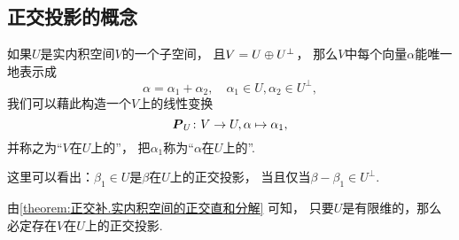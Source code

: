 \subsection{正交投影的概念}
如果\(U\)是实内积空间\(V\)的一个子空间，
且\(V = U \oplus U^\perp\)，
那么\(V\)中每个向量\(\alpha\)能唯一地表示成\begin{equation*}
	\alpha = \alpha_1 + \alpha_2,
	\quad \alpha_1 \in U, \alpha_2 \in U^\perp,
\end{equation*}
我们可以藉此构造一个\(V\)上的线性变换\begin{equation*}
	\boldsymbol{P}_U\colon V \to U,
	\alpha \mapsto \alpha_1,
\end{equation*}
并称之为“\(V\)在\(U\)上的”，	%
把\(\alpha_1\)称为“\(\alpha\)在\(U\)上的”.	%

这里可以看出：\(\beta_1 \in U\)是\(\beta\)在\(U\)上的正交投影，
当且仅当\(\beta - \beta_1 \in U^\perp\).

由\cref{theorem:正交补.实内积空间的正交直和分解} 可知，
只要\(U\)是有限维的，那么必定存在\(V\)在\(U\)上的正交投影.


